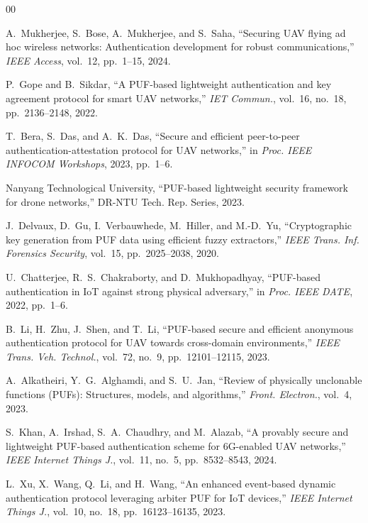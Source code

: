 \documentclass[conference]{IEEEtran}
\begin{document}
\balance
\begin{thebibliography}{00}

A.~Mukherjee, S.~Bose, A.~Mukherjee, and S.~Saha, ``Securing UAV flying ad hoc wireless networks: Authentication development for robust communications,'' \emph{IEEE Access}, vol.~12, pp.~1--15, 2024.

P.~Gope and B.~Sikdar, ``A PUF-based lightweight authentication and key agreement protocol for smart UAV networks,'' \emph{IET Commun.}, vol.~16, no.~18, pp.~2136--2148, 2022.

T.~Bera, S.~Das, and A.~K.~Das, ``Secure and efficient peer-to-peer authentication-attestation protocol for UAV networks,'' in \emph{Proc. IEEE INFOCOM Workshops}, 2023, pp.~1--6.

Nanyang Technological University, ``PUF-based lightweight security framework for drone networks,'' DR-NTU Tech. Rep. Series, 2023.

J.~Delvaux, D.~Gu, I.~Verbauwhede, M.~Hiller, and M.-D.~Yu, ``Cryptographic key generation from PUF data using efficient fuzzy extractors,'' \emph{IEEE Trans. Inf. Forensics Security}, vol.~15, pp.~2025--2038, 2020.

U.~Chatterjee, R.~S.~Chakraborty, and D.~Mukhopadhyay, ``PUF-based authentication in IoT against strong physical adversary,'' in \emph{Proc. IEEE DATE}, 2022, pp.~1--6.

B.~Li, H.~Zhu, J.~Shen, and T.~Li, ``PUF-based secure and efficient anonymous authentication protocol for UAV towards cross-domain environments,'' \emph{IEEE Trans. Veh. Technol.}, vol.~72, no.~9, pp.~12101--12115, 2023.

A.~Alkatheiri, Y.~G.~Alghamdi, and S.~U.~Jan, ``Review of physically unclonable functions (PUFs): Structures, models, and algorithms,'' \emph{Front. Electron.}, vol.~4, 2023.

S.~Khan, A.~Irshad, S.~A.~Chaudhry, and M.~Alazab, ``A provably secure and lightweight PUF-based authentication scheme for 6G-enabled UAV networks,'' \emph{IEEE Internet Things J.}, vol.~11, no.~5, pp.~8532--8543, 2024.

L.~Xu, X.~Wang, Q.~Li, and H.~Wang, ``An enhanced event-based dynamic authentication protocol leveraging arbiter PUF for IoT devices,'' \emph{IEEE Internet Things J.}, vol.~10, no.~18, pp.~16123--16135, 2023.


\end{thebibliography}
\end{document}
